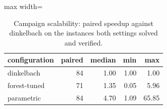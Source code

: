 \begin{table}[tbp]
\centering
\caption{Campaign scalability: paired speedup against dinkelbach on the instances both settings solved and verified.}
\label{tab:scalability-speedup}
\small
\begin{adjustbox}{max width=\textwidth}
\begin{tabular}{lrrrr}
\toprule
configuration & paired & median & min & max \\
\midrule
dinkelbach & 84 & 1.00 & 1.00 & 1.00 \\
forest-tuned & 71 & 1.35 & 0.05 & 5.96 \\
parametric & 84 & 4.70 & 1.09 & 65.85 \\
\bottomrule
\end{tabular}
\end{adjustbox}
\end{table}
